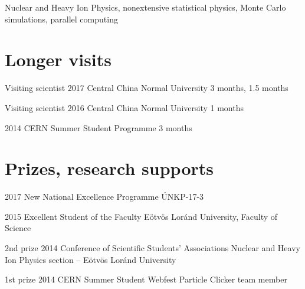 \documentclass{tccv}
\begin{document}
\begin{factlist}
\item{}{Nuclear and Heavy Ion Physics, nonextensive statistical physics, Monte Carlo simulations, parallel computing}
\end{factlist}

%
%
%

\section{Longer visits}

\begin{yearlist}

\item[Visiting scientist]{2017}
    {Central China Normal University}
    {3 months, 1.5 months}

\item[Visiting scientist]{2016}
{Central China Normal University}
{1 months}

\item{2014}
     {CERN Summer Student Programme}
     {3 months}

\end{yearlist}

%
%
%

\section{Prizes, research supports}

\begin{yearlist}

\item{2017}
{New National Excellence Programme}
{ÚNKP-17-3}

\item{2015}
{Excellent Student of the Faculty}
{Eötvös Loránd University, Faculty of Science}

\item[2nd prize]{2014}
{Conference of Scientific Students' Associations}
{Nuclear and Heavy Ion Physics section -- Eötvös Loránd University}

\item[1st prize]{2014}
{CERN Summer Student Webfest}
{Particle Clicker team member}

\end{yearlist}
\end{document}
